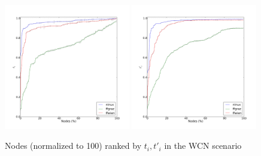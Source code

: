 \documentclass[a4paper,11pt,twoside,openleft]{memoir}
\begin{document}
\begin{figure}[htb]
  \centering
  \hspace*{\fill}
  \includegraphics[width=0.49\textwidth]{graphs/all-default-Tc}
  \hfill
  \includegraphics[width=0.49\textwidth]{graphs/all-default-Rc}
  \hspace*{\fill}
  \caption{Nodes (normalized to 100) ranked by $t_i, t'_i$ in the WCN scenario}
  \label{fig:mp_wcn}
\end{figure}
\end{document}
